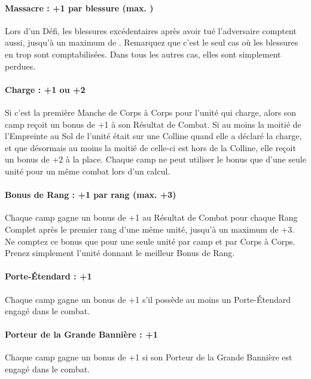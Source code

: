\paragraph{Massacre : +1 par blessure (max. )}

Lors d'un Défi, les blessures excédentaires après avoir tué l'adversaire comptent aussi, jusqu'à un maximum de . Remarquez que c'est le seul cas où les blessures en trop sont comptabilisées. Dans tous les autres cas, elles sont simplement perdues.

\paragraph{Charge : +1 ou +2}

Si c'est la première Manche de Corps à Corps pour l'unité qui charge, alors son camp reçoit un bonus de +1 à son Résultat de Combat. Si au moins la moitié de l'Empreinte au Sol de l'unité était sur une Colline quand elle a déclaré la charge, et que désormais au moins la moitié de celle-ci est hors de la Colline, elle reçoit un bonus de +2 à la place. Chaque camp ne peut utiliser le bonus que d'une seule unité pour un même combat lors d'un calcul.

\paragraph{Bonus de Rang : +1 par rang (max. +3)}

Chaque camp gagne un bonus de +1 au Résultat de Combat pour chaque Rang Complet après le premier rang d'une même unité, jusqu'à un maximum de +3. Ne comptez ce bonus que pour une seule unité par camp et par Corps à Corps. Prenez simplement l'unité donnant le meilleur Bonus de Rang.

\paragraph{Porte-Étendard : +1}

Chaque camp gagne un bonus de +1 s'il possède au moins un Porte-Étendard engagé dans le combat.

\paragraph{Porteur de la Grande Bannière : +1}

Chaque camp gagne un bonus de +1 si son Porteur de la Grande Bannière est engagé dans le combat.

